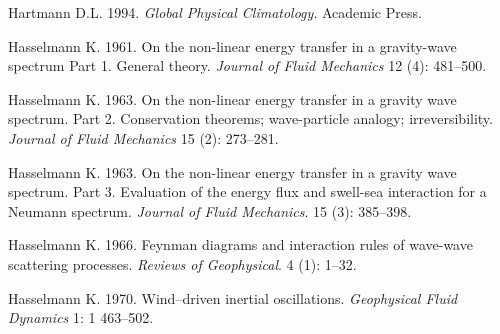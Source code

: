 \begin{thebibliography}{999}
Hartmann D.L.  1994. \textit{Global Physical Climatology}.  Academic
Press.
%

Hasselmann K.  1961. On the non-linear energy transfer in a
gravity-wave spectrum Part 1. General theory. \textit{Journal of Fluid
  Mechanics} 12 (4): 481--500.
%

Hasselmann K.  1963. On the non-linear energy transfer in a gravity
wave spectrum. Part 2. Conservation theorems; wave-particle analogy;
irreversibility.  \textit{Journal of Fluid Mechanics} 15 (2):
273--281.
%

Hasselmann K.  1963. On the non-linear energy transfer in a gravity
wave spectrum. Part 3. Evaluation of the energy flux and swell-sea
interaction for a Neumann spectrum. \textit{Journal of Fluid
  Mechanics}. 15 (3): 385--398.
%

Hasselmann K.  1966. Feynman diagrams and interaction rules of
wave-wave scattering processes. \textit{Reviews of Geophysical}. 4
(1): 1--32.
%

Hasselmann K.  1970. Wind--driven inertial
oscillations. \textit{Geophysical Fluid Dynamics} 1: 1 463--502.
%


\end{thebibliography}
